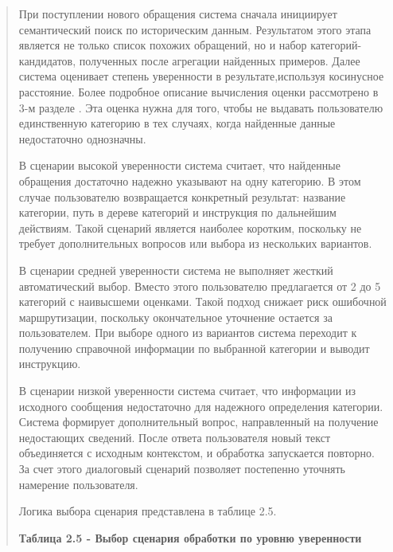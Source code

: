 \begin{quote}
При поступлении нового обращения система сначала инициирует
семантический поиск по историческим данным. Результатом этого этапа
является не только список похожих обращений, но и набор
категорий-кандидатов, полученных после агрегации найденных примеров.
Далее система оценивает степень уверенности в результате,используя
косинусное расстояние. Более подробное описание вычисления оценки
рассмотрено в 3-м разделе . Эта оценка нужна для того, чтобы не выдавать
пользователю единственную категорию в тех случаях, когда найденные
данные недостаточно однозначны.

В сценарии высокой уверенности система считает, что найденные обращения
достаточно надежно указывают на одну категорию. В этом случае
пользователю возвращается конкретный результат: название категории, путь
в дереве категорий и инструкция по дальнейшим действиям. Такой сценарий
является наиболее коротким, поскольку не требует дополнительных вопросов
или выбора из нескольких вариантов.

В сценарии средней уверенности система не выполняет жесткий
автоматический выбор. Вместо этого пользователю предлагается от 2 до 5
категорий с наивысшеми оценками. Такой подход снижает риск ошибочной
маршрутизации, поскольку окончательное уточнение остается за
пользователем. При выборе одного из вариантов система переходит к
получению справочной информации по выбранной категории и выводит
инструкцию.

В сценарии низкой уверенности система считает, что информации из
исходного сообщения недостаточно для надежного определения категории.
Система формирует дополнительный вопрос, направленный на получение
недостающих сведений. После ответа пользователя новый текст объединяется
с исходным контекстом, и обработка запускается повторно. За счет этого
диалоговый сценарий позволяет постепенно уточнять намерение
пользователя.

Логика выбора сценария представлена в таблице 2.5.

\textbf{Таблица 2.5 - Выбор сценария обработки по уровню уверенности}
\end{quote}

